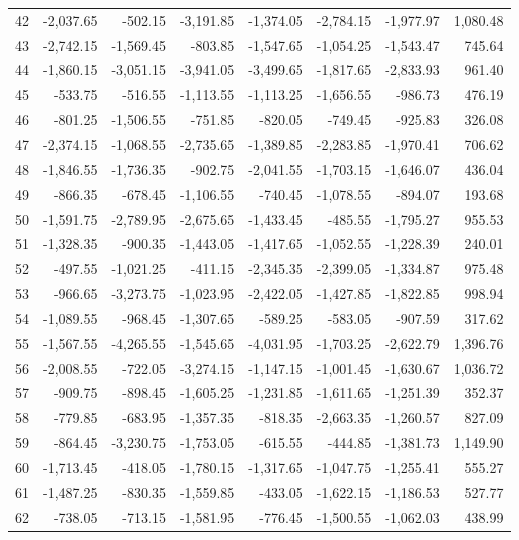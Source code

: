\begin{longtable}{rrrrrrrr}
42 & -2,037.65 & -502.15 & -3,191.85 & -1,374.05 & -2,784.15 & -1,977.97 & 1,080.48  \\
43 & -2,742.15 & -1,569.45 & -803.85 & -1,547.65 & -1,054.25 & -1,543.47 & 745.64  \\
44 & -1,860.15 & -3,051.15 & -3,941.05 & -3,499.65 & -1,817.65 & -2,833.93 & 961.40  \\
45 & -533.75 & -516.55 & -1,113.55 & -1,113.25 & -1,656.55 & -986.73 & 476.19  \\
46 & -801.25 & -1,506.55 & -751.85 & -820.05 & -749.45 & -925.83 & 326.08  \\
47 & -2,374.15 & -1,068.55 & -2,735.65 & -1,389.85 & -2,283.85 & -1,970.41 & 706.62  \\
48 & -1,846.55 & -1,736.35 & -902.75 & -2,041.55 & -1,703.15 & -1,646.07 & 436.04  \\
49 & -866.35 & -678.45 & -1,106.55 & -740.45 & -1,078.55 & -894.07 & 193.68  \\
50 & -1,591.75 & -2,789.95 & -2,675.65 & -1,433.45 & -485.55 & -1,795.27 & 955.53  \\
51 & -1,328.35 & -900.35 & -1,443.05 & -1,417.65 & -1,052.55 & -1,228.39 & 240.01  \\
52 & -497.55 & -1,021.25 & -411.15 & -2,345.35 & -2,399.05 & -1,334.87 & 975.48  \\
53 & -966.65 & -3,273.75 & -1,023.95 & -2,422.05 & -1,427.85 & -1,822.85 & 998.94  \\
54 & -1,089.55 & -968.45 & -1,307.65 & -589.25 & -583.05 & -907.59 & 317.62  \\
55 & -1,567.55 & -4,265.55 & -1,545.65 & -4,031.95 & -1,703.25 & -2,622.79 & 1,396.76  \\
56 & -2,008.55 & -722.05 & -3,274.15 & -1,147.15 & -1,001.45 & -1,630.67 & 1,036.72  \\
57 & -909.75 & -898.45 & -1,605.25 & -1,231.85 & -1,611.65 & -1,251.39 & 352.37  \\
58 & -779.85 & -683.95 & -1,357.35 & -818.35 & -2,663.35 & -1,260.57 & 827.09  \\
59 & -864.45 & -3,230.75 & -1,753.05 & -615.55 & -444.85 & -1,381.73 & 1,149.90  \\
60 & -1,713.45 & -418.05 & -1,780.15 & -1,317.65 & -1,047.75 & -1,255.41 & 555.27  \\
61 & -1,487.25 & -830.35 & -1,559.85 & -433.05 & -1,622.15 & -1,186.53 & 527.77  \\
62 & -738.05 & -713.15 & -1,581.95 & -776.45 & -1,500.55 & -1,062.03 & 438.99  \\

\end{longtable}
